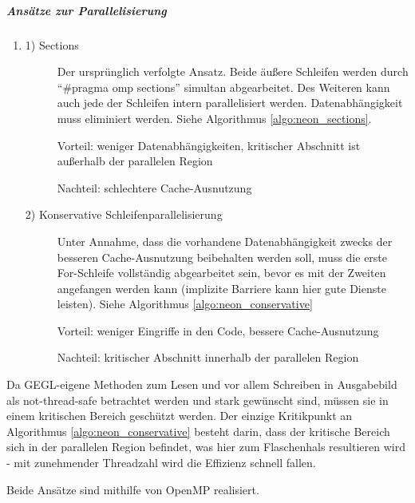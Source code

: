 \subparagraph{Ansätze zur Parallelisierung}
\begin{enumerate}
	\item [] \begin{description} %
		\item[1) Sections] Der ursprünglich verfolgte Ansatz. Beide äußere Schleifen werden durch ``\#pragma omp sections'' simultan abgearbeitet. Des Weiteren kann auch jede der Schleifen intern parallelisiert werden. Datenabhängigkeit muss eliminiert werden. Siehe Algorithmus \ref{algo:neon_sections}.
		
		Vorteil: weniger Datenabhängigkeiten, kritischer Abschnitt ist außerhalb der parallelen Region
		
		Nachteil: schlechtere Cache-Ausnutzung
		\item[2) Konservative Schleifenparallelisierung] Unter Annahme, dass die vorhandene Datenabhängigkeit zwecks der besseren Cache-Ausnutzung beibehalten werden soll, muss die erste For-Schleife vollständig abgearbeitet sein, bevor es mit der Zweiten angefangen werden kann (implizite Barriere kann hier gute Dienste leisten). Siehe Algorithmus \ref{algo:neon_conservative}
		
		Vorteil: weniger Eingriffe in den Code, bessere Cache-Ausnutzung
		
		Nachteil: kritischer Abschnitt innerhalb der parallelen Region 
	\end{description}
\end{enumerate}

Da GEGL-eigene Methoden zum Lesen und vor allem Schreiben in Ausgabebild als not-thread-safe betrachtet werden und stark gewünscht sind, müssen sie in einem kritischen Bereich geschützt werden.
Der einzige Kritikpunkt an Algorithmus \ref{algo:neon_conservative} besteht darin, dass der kritische Bereich sich in der parallelen Region befindet, was hier zum Flaschenhals resultieren wird - mit zunehmender Threadzahl wird die Effizienz schnell fallen.

Beide Ansätze sind mithilfe von OpenMP realisiert.





